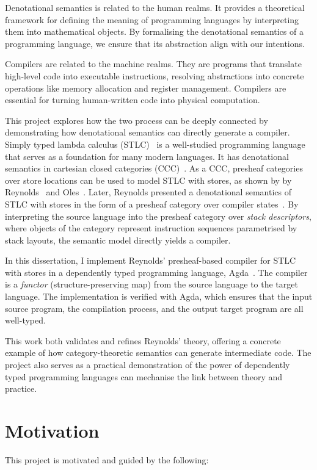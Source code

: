 \documentclass[12pt,a4paper]{report}
\theoremstyle{definition}
\newcounter{motivation}
\begin{document}
    Denotational semantics is related to the human realms. It provides a theoretical framework for defining the meaning of programming languages by interpreting them into mathematical objects. By formalising the denotational semantics of a programming language, we ensure that its abstraction align with our intentions.

    Compilers are related to the machine realms. They are programs that translate high-level code into executable instructions, resolving abstractions into concrete operations like memory allocation and register management. Compilers are essential for turning human-written code into physical computation.

    This project explores how the two process can be deeply connected by demonstrating how denotational semantics can directly generate a compiler. Simply typed lambda calculus (STLC)~\autocite{stlc} is a well-studied programming language that serves as a foundation for many modern languages. It has denotational semantics in cartesian closed categories (CCC)~\autocite{lambek}. As a CCC, presheaf categories over store locations can be used to model STLC with stores, as shown by by Reynolds~\autocite{essence} and Oles~\autocite{Oles_1,Oles_2}. Later, Reynolds presented a denotational semantics of STLC with stores in the form of a presheaf category over compiler states~\autocite{Reynolds}. By interpreting the source language into the presheaf category over \emph{stack descriptors}, where objects of the category represent instruction sequences parametrised by stack layouts, the semantic model directly yields a compiler. 
    
    In this dissertation, I implement Reynolds' presheaf-based compiler for STLC with stores in a dependently typed programming language, Agda~\autocite{Agda}. The compiler is a \emph{functor} (structure-preserving map) from the source language to the target language. The implementation is verified with Agda, which ensures that the input source program, the compilation process, and the output target program are all well-typed.

    This work both validates and refines Reynolds' theory, offering a concrete example of how category-theoretic semantics can generate intermediate code. The project also serves as a practical demonstration of the power of dependently typed programming languages can mechanise the link between theory and practice.

    \section{Motivation} \label{sec: motivation}
        This project is motivated and guided by the following:
        
\end{document}
